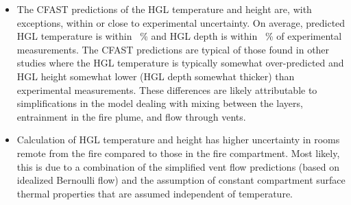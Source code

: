 \begin{itemize}
\item The CFAST predictions of the HGL temperature and height are, with exceptions, within or close to experimental uncertainty. On average, predicted HGL temperature is within \HGLtempavg~\% and HGL depth is within \HGLhgtavg~\% of experimental measurements. The CFAST predictions are typical of those found in other studies where the HGL temperature is typically somewhat over-predicted and HGL height somewhat lower (HGL depth somewhat thicker) than experimental measurements. These differences are likely attributable to simplifications in the model dealing with mixing between the layers, entrainment in the fire plume, and flow through vents. 
\item Calculation of HGL temperature and height has higher uncertainty in rooms remote from the fire compared to those in the fire compartment.  Most likely, this is due to a combination of the simplified vent flow predictions (based on idealized Bernoulli flow) and the assumption of constant compartment surface thermal properties that are assumed independent of temperature.
\end{itemize}




